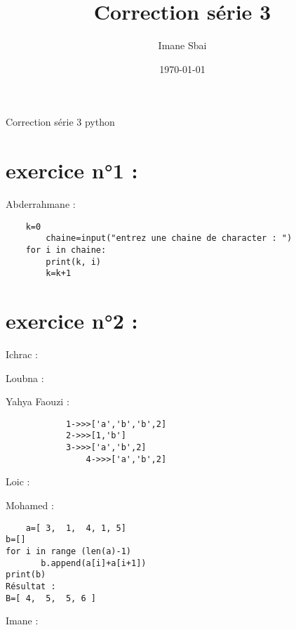 \documentclass{article}
\title{Correction série 3}
\author{Imane Sbai}
\date {\today}
\begin{document}
\begin{titlepage}
    \begin{center}
Correction s\'{e}rie 3 python
    \end{center}
\end{titlepage}

\section{exercice n°1 :}
	\begin{center}
    		Abderrahmane :
	\end{center} 
	
	\begin{verbatim}
	k=0
    	chaine=input("entrez une chaine de character : ")
	for i in chaine:
   		print(k, i)
	   	k=k+1
	\end{verbatim}
\section{exercice n°2 :}

	\begin{center}
    		Ichrac :
	\end{center}
	
	
	\begin{center}
    		Loubna :
	\end{center} 
	

        \begin{center}
    		 Yahya Faouzi :
	\end{center}    	  
        	
    	\begin{verbatim}
        	1->>>['a','b','b',2]
	    	2->>>[1,'b']
	    	3->>>['a','b',2]
                4->>>['a','b',2]

        \end{verbatim}
         
	\begin{center}
    		Loic :
	\end{center} 
	
	
	\begin{center}
    		Mohamed :
	\end{center}
	
	\begin{verbatim}
	a=[ 3,  1,  4, 1, 5]
b=[]
for i in range (len(a)-1)
       b.append(a[i]+a[i+1])
print(b)
Résultat :
B=[ 4,  5,  5, 6 ]
	\end{verbatim}

	\begin{center}
    		Imane :
        \end{center} 
	
\end{document}
